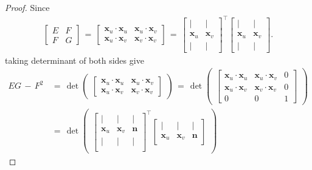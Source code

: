 \documentclass{UKZNcomp}
\newcommand{\vect}[1]{\mathbf{#1}} %
\theoremstyle{definition}
\theoremstyle{remark}
\begin{document}
\begin{proof}
Since
\begin{align*}
\begin{bmatrix}
    E & F\\
    F & G
\end{bmatrix}
\,=\,
\begin{bmatrix}
    \vect x_u\cdot\vect x_u & \vect x_u\cdot\vect x_v\\
    \vect x_u\cdot\vect x_v & \vect x_v\cdot\vect x_v
\end{bmatrix}
\,=\,
\begin{bmatrix}
    | & |\\
    \vect x_u & \vect x_v\\
    | & |
\end{bmatrix}^\intercal
\begin{bmatrix}
    | & |\\
    \vect x_u & \vect x_v\\
    | & |
\end{bmatrix}.
\end{align*}
taking determinant of both sides give
\begin{align*}
EG\,-\,F^2\,&=\,\det\begin{pmatrix}
\begin{bmatrix}
    \vect x_u\cdot\vect x_u & \vect x_u\cdot\vect x_v\\
    \vect x_u\cdot\vect x_v & \vect x_v\cdot\vect x_v
\end{bmatrix}
\end{pmatrix}
\,	=\,
\det\begin{pmatrix}
\begin{bmatrix}
    \vect x_u\cdot\vect x_u & \vect x_u\cdot\vect x_v & 0\\
    \vect x_u\cdot\vect x_v & \vect x_v\cdot\vect x_v & 0\\
     0 & 0 & 1
\end{bmatrix}
\end{pmatrix}\\
&=\,
\det\begin{pmatrix}
\begin{bmatrix}
    | & | & |\\
    \vect x_u & \vect x_v & \vect{n}\\
    | & | & |\\
\end{bmatrix}^\intercal
\begin{bmatrix}
    | & | & |\\
    \vect x_u & \vect x_v & \vect{n}\\

\end{bmatrix}
\end{pmatrix}
\end{align*}
\end{proof}
\end{document}

